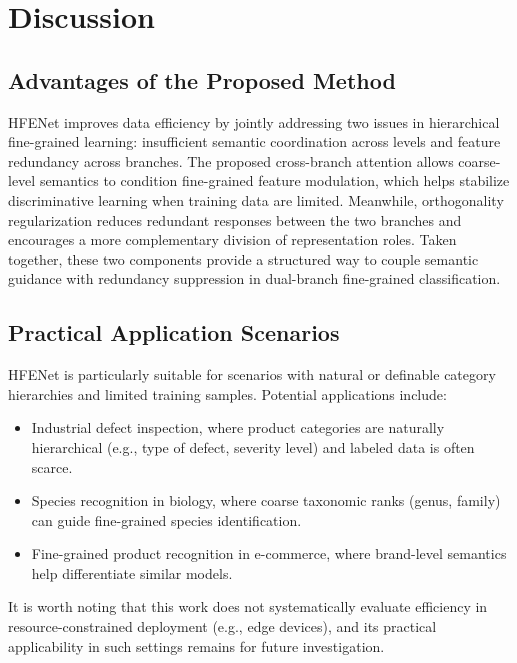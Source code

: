 \documentclass[pdflatex,sn-mathphys-num]{sn-jnl}
\theoremstyle{thmstyleone}%
\theoremstyle{thmstyletwo}%
\theoremstyle{thmstylethree}%
\begin{document}
\section{Discussion}
\label{sec:discussion}

\subsection{Advantages of the Proposed Method}
HFENet improves data efficiency by jointly addressing two issues in hierarchical fine-grained learning: insufficient semantic coordination across levels and feature redundancy across branches. The proposed cross-branch attention allows coarse-level semantics to condition fine-grained feature modulation, which helps stabilize discriminative learning when training data are limited. Meanwhile, orthogonality regularization reduces redundant responses between the two branches and encourages a more complementary division of representation roles. Taken together, these two components provide a structured way to couple semantic guidance with redundancy suppression in dual-branch fine-grained classification.

\subsection{Practical Application Scenarios}
HFENet is particularly suitable for scenarios with natural or definable category hierarchies and limited training samples. Potential applications include:
\begin{itemize}
    \item Industrial defect inspection, where product categories are naturally hierarchical (e.g., type of defect, severity level) and labeled data is often scarce.
    \item Species recognition in biology, where coarse taxonomic ranks (genus, family) can guide fine-grained species identification.
    \item Fine-grained product recognition in e-commerce, where brand-level semantics help differentiate similar models.
\end{itemize}
It is worth noting that this work does not systematically evaluate efficiency in resource-constrained deployment (e.g., edge devices), and its practical applicability in such settings remains for future investigation.
\end{document}
